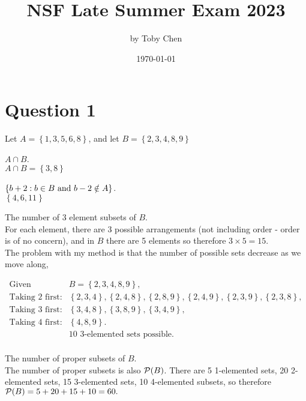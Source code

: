 \documentclass{article}
\title{NSF Late Summer Exam 2023}
\author{by Toby Chen}
\date{\today}
\begin{document}
    \maketitle

    \tableofcontents

    \section{Question 1}
        Let $A = \left\{ 1,3,5,6,8 \right\}$, and let $B = \left\{ 2,3,4,8,9 \right\}$ 

            $A\cap B$.\\

            \ans $A\cap B = \left\{ 3, 8 \right\}$

            $\left\{ b + 2: b\in B \text{ and } b-2 \notin A \right\}$.\\

            \ans $\left\{ 4, 6, 11 \right\}$

            The number of 3 element subsets of $B$.\\

            \ans For each element, there are 3 possible arrangements (not including order - order is of no concern), and in $B$ there are 5 elements so therefore $3\times 5 = 15$. \xmark\\

            \rans The problem with my method is that the number of possible sets decrease as we move along,

            \begin{align*}
                \text{Given }&B=\left\{ 2,3,4,8,9 \right\},\\
                \text{Taking }2\text{ first:}&\left\{ 2,3,4 \right\}, \left\{ 2,4,8 \right\}, \left\{ 2,8,9 \right\}, \left\{ 2, 4, 9 \right\}, \left\{ 2,3,9 \right\}, \left\{ 2,3,8 \right\},\\
                \text{Taking }3\text{ first:}&\left\{ 3,4,8 \right\}, \left\{ 3,8,9 \right\}, \left\{ 3,4,9 \right\},\\
                \text{Taking }4\text{ first:}&\left\{ 4,8,9 \right\}.\\
                &\text{10 3-elemented sets possible}.\\
            \end{align*}

            The number of proper subsets of $B$.\\

            \ans The number of proper subsets is also $\mathcal{P}(B)$. There are 5 1-elemented sets, 20 2-elemented sets, 15 3-elemented sets, 10 4-elemented subsets, so therefore $\mathcal{P}(B) = 5 + 20 + 15 + 10 = 60.$ \xmark\\

            \rans
\end{document}
